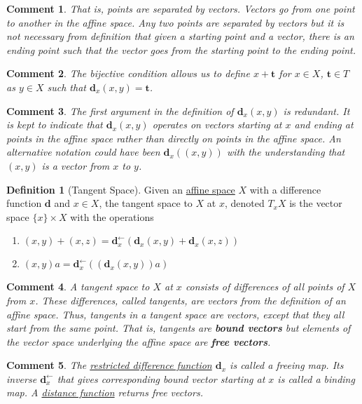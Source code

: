 \documentclass[letterpaper,12pt]{article}
\theoremstyle{plain}
\theoremstyle{plain}
\newtheorem*{cmnt*}{Comment}
\theoremstyle{definition}
\newtheorem{defn}{Definition}
\begin{document}
\begin{cmnt*}That is, points are separated by vectors. Vectors go from one point to another in the affine space. Any two points are separated by vectors but it is not necessary from definition that given a starting point and a vector, there is an ending point such that the vector goes from the starting point to the ending point.\end{cmnt*}
\begin{cmnt*}The bijective condition allows us to define $x+\mathbf{t}$ for $x\in X$, $\mathbf{t}\in T$ as $y\in X$ such that $\mathbf{d}_x(x,y)=\mathbf{t}$.\end{cmnt*}
\begin{cmnt*}The first argument in the definition of $\mathbf{d}_x(x,y)$ is redundant. It is kept to indicate that $\mathbf{d}_x(x,y)$ operates on vectors starting at $x$ and ending at points in the affine space rather than directly on points in the affine space. An alternative notation could have been $\mathbf{d}_x((x,y))$ with the understanding that $(x,y)$ is a vector from $x$ to $y$.\end{cmnt*}

\begin{defn}[Tangent Space]\label{deftsp}
Given an \hyperref[defafsp]{affine space} $X$ with a difference function $\mathbf{d}$ and $x \in X$, the tangent space to $X$ at $x$, denoted $T_xX$ is the vector space $\{x\}\times X$ with the operations
\begin{enumerate}
\item $(x,y) + (x,z) = \mathbf{d}_x^{\leftarrow}\left( \mathbf{d}_x(x,y)+\mathbf{d}_x(x,z) \right)$
\item $(x,y)a = \mathbf{d}_x^{\leftarrow}\left( (\mathbf{d}_x(x,y))a \right)$
\end{enumerate}
\end{defn}

\begin{cmnt*}A tangent space to $X$ at $x$ consists of differences of all points of $X$ from $x$. These differences, called tangents, are vectors from the definition of an affine space. Thus, tangents in a tangent space are vectors, except that they all start from the same point. That is, tangents are \textbf{bound vectors} but elements of the vector space underlying the affine space are \textbf{free vectors}.\end{cmnt*}
\begin{cmnt*}The \hyperref[defafsp]{restricted difference function} $\mathbf{d}_x$ is called a freeing map. Its inverse $\mathbf{d}_x^{\leftarrow}$ that gives corresponding bound vector starting at $x$ is called a binding map. A \hyperref[defafsp]{distance function} returns free vectors.\end{cmnt*}
\end{document}
